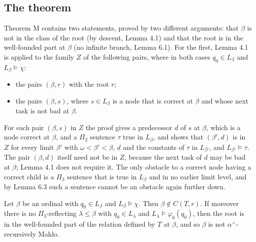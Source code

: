 \documentclass[11pt]{article}
\begin{document}
\subsection{The theorem}

Theorem M contains two statements, proved by two different arguments: that $\beta$ is not in the class of the root
(by descent, Lemma 4.1) and that the root is in the well-founded part at $\beta$ (no infinite branch, Lemma 6.1). For
the first, Lemma 4.1 is applied to the family $Z$ of the following pairs, where in both cases $q_0 \in L_{\beta}$ and
$L_{\beta} \models \chi$:

\begin{itemize}
\item the pairs $(\beta, r)$ with the root $r$;
\item the pairs $(\beta, s)$, where $s \in L_{\beta}$ is a node that is correct at $\beta$ and whose next
  task is not bad at $\beta$.
\end{itemize}

For each pair $(\beta, s)$ in $Z$ the proof gives a predecessor $d$ of $s$ at $\beta$, which is a node correct at
$\beta$, and a $\Pi_2$ sentence $\tau$ true in $L_{\beta}$, and shows that $(\beta', d)$ is in $Z$ for
every limit $\beta'$ with $\omega < \beta' < \beta$, $d$ and the constants of $\tau$ in $L_{\beta'}$, and
$L_{\beta'} \models \tau$. The pair
$(\beta, d)$ itself need not be in $Z$, because the next task of $d$ may be bad at $\beta$; Lemma 4.1 does not require
it. The only obstacle to a correct node having a correct child is a $\Pi_3$ sentence that is true in $L_{\beta}$ and in no
earlier limit level, and by Lemma 6.3 such a sentence cannot be an obstacle again further down.

\begin{statement} Let $\beta$ be an ordinal with $q_0 \in L_{\beta}$ and $L_{\beta} \models \chi$. Then
$\beta \notin C(T, r)$. If moreover there is no $\Pi_3$-reflecting $\lambda \le \beta$ with $q_0 \in L_{\lambda}$ and
$L_{\lambda} \models \varphi_0(q_0)$, then the root is in the well-founded part of the relation defined by $T$ at
$\beta$, and so $\beta$ is not $\alpha^+$-recursively Mahlo.
\end{statement}
\end{document}

